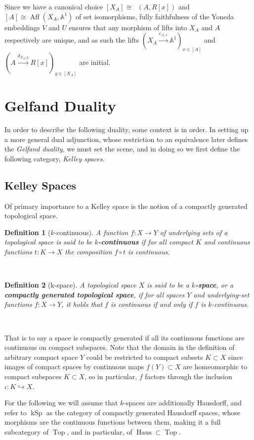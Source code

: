 \documentclass[12pt,a4paper]{article}
\newtheorem{definition}{Definition}[section] %
\DeclareMathOperator{\Top}{Top}
\DeclareMathOperator{\CAlg}{CAlg_R}
\DeclareMathOperator{\Aff}{Aff}
\DeclareMathOperator{\kSp}{kSp}
\DeclareMathOperator{\Haus}{Haus}
\begin{document}
Since we have a canonical choice $[X_A] \cong \CAlg(A, R[x])$ and $[A] \cong \Aff(X_A,\mathbb{A}^1)$ of set isomorphisms, fully faithfulness of the Yoneda embeddings $V$ and $U$ ensures that any morphism of lifts into $X_A$ and $A$ respectively are unique, and as such the lifts $(X_A \stackrel{e_{A,x}}{\to}\mathbb{A}^1)_{x \in [A]}$ and $(A \stackrel{d_{X_A,y}}{\to} R[x])_{y \in [X_A]}$ are initial.
%

\section{Gelfand Duality}
In order to describe the following duality, some context is in order. In setting up a more general dual adjunction, whose restriction to an equivalence later defines the \emph{Gelfand duality}, we must set the scene, and in doing so we first define the following category, \emph{Kelley spaces}.
\subsection{Kelley Spaces}
Of primary importance to a Kelley space is the notion of a compactly generated topological space.
\\
\begin{definition}[$k$-continuous]
	A function $f: X \to Y$ of underlying sets of a topological space is said to be \textbf{$k$-continuous} if for all compact $K$ and continuous functions $t: K \to X$ the composition $f \circ t$ is continuous. 
\end{definition}
\
\begin{definition}[k-space]
A topological space $X$ is said to be a \textbf{$k$-space}, or a \textbf{compactly generated topological space}, if for all spaces $Y$ and underlying-set functions $f: X \to Y$, it holds that $f$ is continuous if and only if $f$ is $k$-continuous.	
\end{definition}
\



That is to say a space is compactly generated if all its continuous functions are continuous on compact subspaces. Note that the domain in the definition of arbitrary compact space $Y$ could be restricted to compact subsets $K \subset X$ since images of compact spaces by continuous maps $f(Y) \subset X$ are homeomorphic to compact subspaces  $K \subset X$, so in particular, $f$ factors through the inclusion $\iota: K \hookrightarrow X$. 

For the following we will assume that $k$-spaces are additionally Hausdorff, and refer to ${\kSp}$ as the category of compactly generated Hausdorff spaces, whose morphisms are the continuous functions between them, making it a full subcategory of $\Top$, and in particular, of $\Haus \subset \Top$. 
\end{document}
